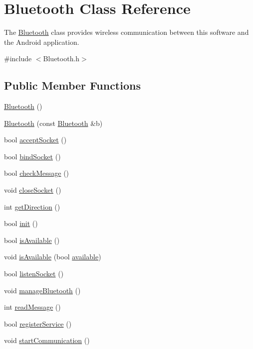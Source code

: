 \hypertarget{classBluetooth}{}\section{Bluetooth Class Reference}
\label{classBluetooth}


The \hyperlink{classBluetooth}{Bluetooth} class provides wireless communication between this software and the Android application.  




{\ttfamily \#include $<$Bluetooth.\+h$>$}

\subsection*{Public Member Functions}
\begin{DoxyCompactItemize}
\item 
\hyperlink{classBluetooth_adff22f9e5f2bd81b1fc5b8eeba71f68b}{Bluetooth} ()
\item 
\hyperlink{classBluetooth_a89e37d06353e375c0c05d02caca60e7a}{Bluetooth} (const \hyperlink{classBluetooth}{Bluetooth} \&b)
\item 
bool \hyperlink{classBluetooth_a1d1d79331f7ac176240617f864c90986}{accept\+Socket} ()
\item 
bool \hyperlink{classBluetooth_a9b72d26b9ca3954c61b07aa31a29b87a}{bind\+Socket} ()
\item 
bool \hyperlink{classBluetooth_a7a14c1d4892ab911f24fe241c0f9d8bd}{check\+Message} ()
\item 
void \hyperlink{classBluetooth_ad827d394aff7e1b67b552e77c939fe97}{close\+Socket} ()
\item 
int \hyperlink{classBluetooth_a06b93309bc14bf3c8c1522a859b46a93}{get\+Direction} ()
\item 
bool \hyperlink{classBluetooth_afb4dda9fe9df7c2ebf02efdafe17bc5f}{init} ()
\item 
bool \hyperlink{classBluetooth_a5355c79812948221e6f0c9c47b191b8a}{is\+Available} ()
\item 
void \hyperlink{classBluetooth_aa6cd9fe9e9d0472579d53c79d0a3e644}{is\+Available} (bool \hyperlink{classBluetooth_a6a16541ed58b634caff713ca4209e975}{available})
\item 
bool \hyperlink{classBluetooth_aae394d2379c39a67d9efbca886da9e25}{listen\+Socket} ()
\item 
void \hyperlink{classBluetooth_ae13d797ede1bb492eded4285142a7f3c}{manage\+Bluetooth} ()
\item 
int \hyperlink{classBluetooth_a9bcc560b34605070e72b2b285b1d4f16}{read\+Message} ()
\item 
bool \hyperlink{classBluetooth_a1b1b147c12429192e8ef7e543e6e4d67}{register\+Service} ()
\item 
void \hyperlink{classBluetooth_acee37e1c96d3b1f39ace4d58c43190bf}{start\+Communication} ()
\end{DoxyCompactItemize}

